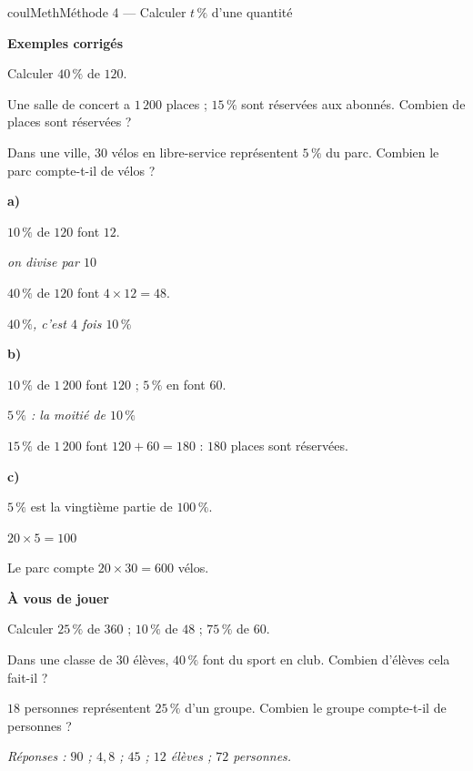\documentclass[11pt,a4paper]{article}
\makeatletter
\newcounter{lycee@signet}
\newcommand{\signet}[3][]{\stepcounter{lycee@signet}%
  \edef\lycee@dest{\if\relax\detokenize{#1}\relax
    signet.\arabic{lycee@signet}\else#1\fi}%
  \hypertarget{\lycee@dest}{}\bookmark[level=#2,dest=\lycee@dest]{#3}}
\newcommand{\res}[1]{#1}
\newcounter{methode}
\newenvironment{methodebox}[1][Méthode]{\stepcounter{methode}%
  \begin{boitecours}[phantom={\signet[methode-\arabic{methode}]{2}{#1}}]{coulMeth}{#1}}%
  {\end{boitecours}}
\newcommand{\etape}[1]{\par\smallskip\textbf{\color{coulMeth}#1}\par\nobreak\smallskip}
\newcommand{\reponse}[1]{\par\smallskip
  {\footnotesize\itshape\color{black!55}Réponses : #1}}
\newcommand{\explique}[2]{\par\smallskip\noindent
  \begin{minipage}[t]{0.57\linewidth}\raggedright #1\end{minipage}\hfill
  \begin{minipage}[t]{0.40\linewidth}\raggedright\leavevmode
    {\small\itshape\color{black!60}#2}\end{minipage}\par}
\newcommand{\cas}[1]{\par\smallskip\noindent\textbf{\color{coulExo}#1}\vadjust{\nobreak}}
\newenvironment{correction}{\par}{\par}
\newcommand{\etapeexemples}{\etape{Exemples corrigés}}
\makeatother
\begin{document}
\begin{methodebox}[Méthode 4 --- Calculer $t\,\%$ d'une quantité]
\etapeexemples
\begin{questions}[label=\alph*)]
  \item Calculer $40\,\%$ de $120$.
  \item Une salle de concert a $1\,200$ places ; $15\,\%$ sont réservées aux abonnés.
        Combien de places sont réservées ?
  \item Dans une ville, $30$ vélos en libre-service représentent $5\,\%$ du parc.
        Combien le parc compte-t-il de vélos ?
\end{questions}
\begin{correction}
\cas{a)}
\explique{$10\,\%$ de $120$ font $12$.}{on divise par $10$}
\explique{$40\,\%$ de $120$ font $4\times 12=\res{48}$.}{$40\,\%$, c'est $4$ fois
$10\,\%$}
\cas{b)}
\explique{$10\,\%$ de $1\,200$ font $120$ ; $5\,\%$ en font $60$.}{$5\,\%$ : la moitié
de $10\,\%$}
\explique{$15\,\%$ de $1\,200$ font $120+60=180$ : \res{$180$ places} sont réservées.}{}
\cas{c)}
\explique{$5\,\%$ est la vingtième partie de $100\,\%$.}{$20\times 5=100$}
\explique{Le parc compte $20\times 30=\res{600}$ vélos.}{}
\end{correction}

\etape{À vous de jouer}
\begin{questions}
  \item Calculer $25\,\%$ de $360$ ; $10\,\%$ de $48$ ; $75\,\%$ de $60$.
  \item Dans une classe de $30$ élèves, $40\,\%$ font du sport en club. Combien
        d'élèves cela fait-il ?
  \item $18$ personnes représentent $25\,\%$ d'un groupe. Combien le groupe
        compte-t-il de personnes ?
\end{questions}
\reponse{$90$ ;\; $4{,}8$ ;\; $45$ ;\; $12$ élèves ;\; $72$ personnes.}
\end{methodebox}
\end{document}
